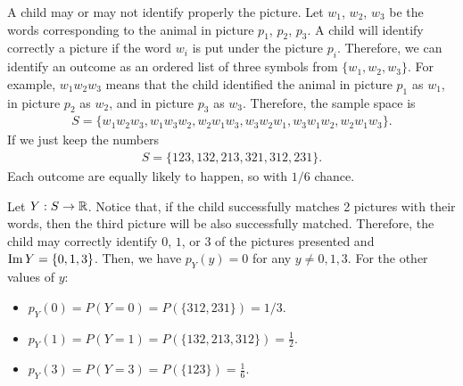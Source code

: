     \begin{problem}
    A child may or may not identify properly the picture. Let $w_1$, $w_2$, $w_3$ be the words corresponding to the animal in picture $p_1$, $p_2$, $p_3$. A child will identify correctly a picture if the word $w_i$ is put under the picture $p_i$. Therefore, we can identify an outcome as an ordered list of three symbols from $\{ w_1, w_2 , w_3 \}$. For example, $w_1 w_2 w_3$ means that the child identified the animal in picture $p_1$ as $w_1$, in picture $p_2$ as $w_2$, and in picture $p_3$ as $w_3$. Therefore, the sample space is
        \begin{align*}
        S = \{ w_1w_2w_3, w_1w_3w_2, w_2w_1w_3, w_3 w_2 w_1, w_3 w_1 w_2, w_2 w_1 w_3 \} .
        \end{align*} 
    If we just keep the numbers
        \begin{align*}
        S = \{ 123, 132, 213, 321, 312, 231 \} .
        \end{align*} 
    Each outcome are equally likely to happen, so with $1/6$ chance.

    Let $Y : S \rightarrow \mathbb{R}$. Notice that, if the child successfully matches 2 pictures with their words, then the third picture will be also successfully matched. Therefore, the child may correctly identify $0$, $1$, or $3$ of the pictures presented and $\operatorname{Im} Y = \{ 0 , 1, 3 \}$. Then, we have $p_Y (y) = 0$ for any $y \neq 0, 1, 3$. For the other values of $y$:
        \begin{itemize}
            \item $p_Y (0) = P (Y = 0) = P (\{ 312, 231 \}) = 1/3$.
            \item $p_Y (1) = P (Y = 1) = P (\{ 132, 213, 312 \}) = \frac{1}{2}$.
            \item $p_Y (3) = P (Y = 3) = P (\{ 123 \}) = \frac{1}{6}$. 
        \end{itemize}
    \end{problem}

